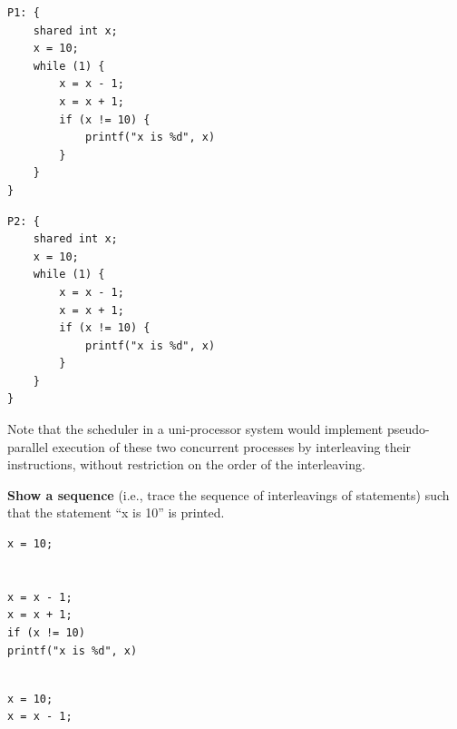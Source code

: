 \documentclass[11pt,largemargins]{homework}
\begin{document}
\maketitle


\begin{minipage}{\textwidth}
    \begin{minipage}{.4\textwidth}
        \begin{verbatim}
P1: {
    shared int x;
    x = 10;
    while (1) {
        x = x - 1;
        x = x + 1;
        if (x != 10) {
            printf("x is %d", x)
        }
    }
}
        \end{verbatim}
    \end{minipage}
    \hfill{}
    \begin{minipage}{.4\textwidth}
        \begin{verbatim}
P2: {
    shared int x;
    x = 10;
    while (1) {
        x = x - 1;
        x = x + 1;
        if (x != 10) {
            printf("x is %d", x)
        }
    }
}
        \end{verbatim}
    \end{minipage}
\end{minipage}
Note that the scheduler in a uni-processor system would implement
pseudo-parallel execution of these
two concurrent processes by interleaving their instructions, without
restriction on the order of the
interleaving.

\textbf{Show a sequence} (i.e., trace the sequence of interleavings of
statements) such that the statement
“x is 10” is printed.

\begin{minipage}{.4\textwidth}
    \begin{minipage}{.15\textwidth}
        \begin{verbatim}
x = 10;


x = x - 1;
x = x + 1;
if (x != 10)
printf("x is %d", x)
        \end{verbatim}
    \end{minipage}
    \hfill{}
    \begin{minipage}{.15\textwidth}
        \begin{verbatim}

x = 10;
x = x - 1;
            
            
            
            
        \end{verbatim}
    \end{minipage}
\end{minipage}
\end{document}
